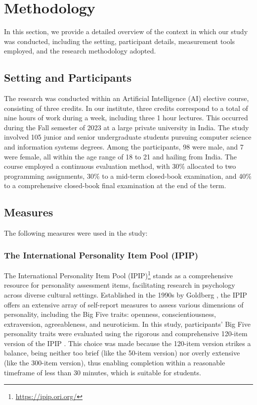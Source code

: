 \section{Methodology} \label{sec:method}

In this section, we provide a detailed overview of the context in which our study was conducted, including the setting, participant details, measurement tools employed, and the research methodology adopted.

\subsection{Setting and Participants}
The research was conducted within an Artificial Intelligence (AI) elective course, consisting of three credits. In our institute, three credits correspond to a total of nine hours of work during a week, including three 1 hour lectures. This occurred during the Fall semester of 2023 at a large private university in India. The study involved 105 junior and senior undergraduate students pursuing computer science and information systems degrees. Among the participants, 98 were male, and 7 were female, all within the age range of 18 to 21 and hailing from India. The course employed a continuous evaluation method, with 30\% allocated to two programming assignments, 30\% to a mid-term closed-book examination, and 40\% to a comprehensive closed-book final examination at the end of the term.

\subsection{Measures}
The following measures were used in the study:
\subsubsection{The International Personality Item Pool (IPIP)}
The International Personality Item Pool (IPIP)\footnote{\url{https://ipip.ori.org/}} stands as a comprehensive resource for personality assessment items, facilitating research in psychology across diverse cultural settings. Established in the 1990s by Goldberg \cite{Goldberg}, the IPIP offers an extensive array of self-report measures to assess various dimensions of personality, including the Big Five traits: openness, conscientiousness, extraversion, agreeableness, and neuroticism. In this study, participants' Big Five personality traits were evaluated using the rigorous and comprehensive 120-item version of the IPIP \cite{JOHNSON201478}. This choice was made because the 120-item version strikes a balance, being neither too brief (like the 50-item version) nor overly extensive (like the 300-item version), thus enabling completion within a reasonable timeframe of less than 30 minutes, which is suitable for students.

